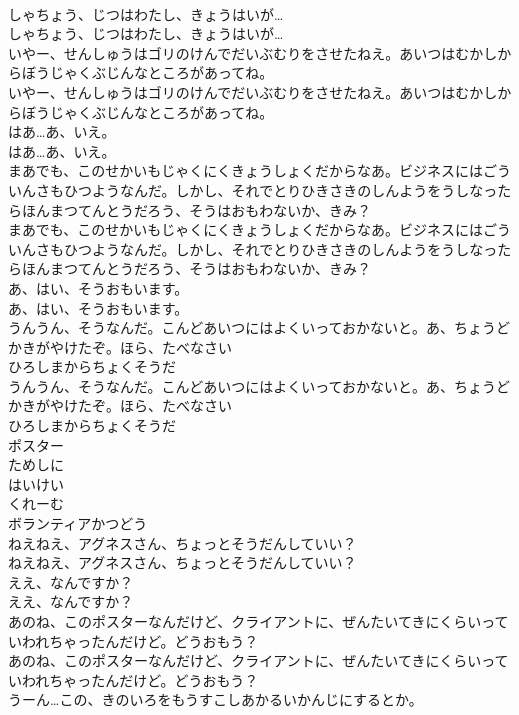 \documentclass[8pt]{extreport}
\begin{document}
\begin{CJK}{UTF8}{min}
\\	しゃちょう、じつはわたし、きょうはいが…
\\	しゃちょう、じつはわたし、きょうはいが…
\\	いやー、せんしゅうはゴリのけんでだいぶむりをさせたねえ。あいつはむかしからぼうじゃくぶじんなところがあってね。
\\	いやー、せんしゅうはゴリのけんでだいぶむりをさせたねえ。あいつはむかしからぼうじゃくぶじんなところがあってね。
\\	はあ…あ、いえ。
\\	はあ…あ、いえ。
\\	まあでも、このせかいもじゃくにくきょうしょくだからなあ。ビジネスにはごういんさもひつようなんだ。しかし、それでとりひきさきのしんようをうしなったらほんまつてんとうだろう、そうはおもわないか、きみ？
\\	まあでも、このせかいもじゃくにくきょうしょくだからなあ。ビジネスにはごういんさもひつようなんだ。しかし、それでとりひきさきのしんようをうしなったらほんまつてんとうだろう、そうはおもわないか、きみ？
\\	あ、はい、そうおもいます。
\\	あ、はい、そうおもいます。
\\	うんうん、そうなんだ。こんどあいつにはよくいっておかないと。あ、ちょうどかきがやけたぞ。ほら、たべなさい
\\	ひろしまからちょくそうだ
\\	うんうん、そうなんだ。こんどあいつにはよくいっておかないと。あ、ちょうどかきがやけたぞ。ほら、たべなさい
\\	ひろしまからちょくそうだ
\\	ポスター
\\	ためしに
\\	はいけい
\\	くれーむ
\\	ボランティアかつどう
\\	ねえねえ、アグネスさん、ちょっとそうだんしていい？
\\	ねえねえ、アグネスさん、ちょっとそうだんしていい？
\\	ええ、なんですか？
\\	ええ、なんですか？
\\	あのね、このポスターなんだけど、クライアントに、ぜんたいてきにくらいっていわれちゃったんだけど。どうおもう？
\\	あのね、このポスターなんだけど、クライアントに、ぜんたいてきにくらいっていわれちゃったんだけど。どうおもう？
\\	うーん…この、きのいろをもうすこしあかるいかんじにするとか。

\end{CJK}
\end{document}
